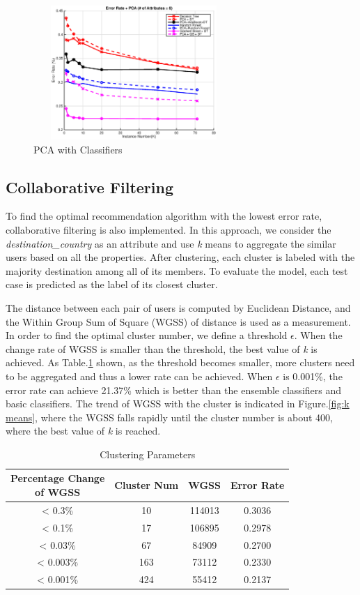 \documentclass{sig-alternate-05-2015}
\begin{document}
\begin{figure}[!htb]
\centering
\includegraphics[height=2in,width=3in]{PCA_Classifiers}
\caption{PCA with Classifiers}
\label{fig:pca}
\end{figure}

\subsection{Collaborative Filtering}

To find the optimal recommendation algorithm with the lowest error rate, collaborative filtering is also implemented. In this approach, we consider the \emph{destination\_country} as an attribute and use \emph{k} means to aggregate the similar users based on all the properties. After clustering, each cluster is labeled with the majority destination among all of its members. To evaluate the model, each test case is predicted as the label of its closest cluster. 

The distance between each pair of users is computed by Euclidean Distance, and the Within Group Sum of Square (WGSS) of distance is used as a measurement. In order to find the optimal cluster number, we define a threshold $\epsilon$. When the change rate of WGSS is smaller than the threshold, the best value of \emph{k} is achieved. As Table.\ref{table:clustering} shown, as the threshold becomes smaller, more clusters need to be aggregated and thus a lower rate can be achieved. When $\epsilon$ is 0.001\%, the error rate can achieve 21.37\% which is better than the ensemble classifiers and basic classifiers. The trend of WGSS with the cluster is indicated in Figure.\ref{fig:k means}, where the WGSS falls rapidly until the cluster number is about 400, where the best value of \emph{k} is reached.

\begin{table}[!htb]
\centering
\caption{Clustering Parameters}
\label{table:clustering}
\begin{tabular}{|c|c|c|c|} \hline
\shortstack[l]{Percentage Change \\ of WGSS} & Cluster Num & WGSS & Error Rate \\ \hline
< 0.3\% & 10 & 114013 & 0.3036 \\ \hline
< 0.1\% & 17 & 106895 & 0.2978 \\ \hline
< 0.03\% & 67 & 84909 & 0.2700 \\ \hline
< 0.003\% & 163 & 73112 & 0.2330 \\ \hline
< 0.001\% & 424 & 55412 & 0.2137 \\
\hline\end{tabular}
\end{table}
\end{document}
